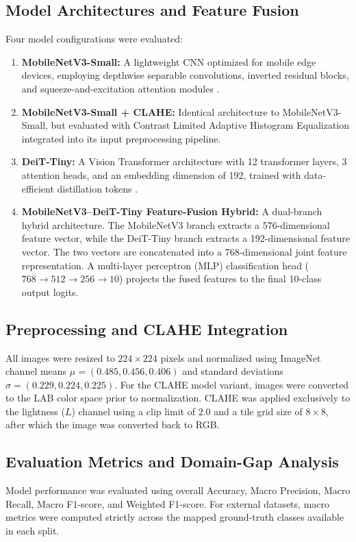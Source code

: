 \documentclass[10pt,journal,compsoc]{IEEEtran}
\begin{document}
\subsection{Model Architectures and Feature Fusion}
Four model configurations were evaluated:
\begin{enumerate}
    \item \textbf{MobileNetV3-Small:} A lightweight CNN optimized for mobile edge devices, employing depthwise separable convolutions, inverted residual blocks, and squeeze-and-excitation attention modules \cite{howard2019}.
    \item \textbf{MobileNetV3-Small + CLAHE:} Identical architecture to MobileNetV3-Small, but evaluated with Contrast Limited Adaptive Histogram Equalization integrated into its input preprocessing pipeline.
    \item \textbf{DeiT-Tiny:} A Vision Transformer architecture with 12 transformer layers, 3 attention heads, and an embedding dimension of 192, trained with data-efficient distillation tokens \cite{touvron2021}.
    \item \textbf{MobileNetV3--DeiT-Tiny Feature-Fusion Hybrid:} A dual-branch hybrid architecture. The MobileNetV3 branch extracts a 576-dimensional feature vector, while the DeiT-Tiny branch extracts a 192-dimensional feature vector. The two vectors are concatenated into a 768-dimensional joint feature representation. A multi-layer perceptron (MLP) classification head ($768 \rightarrow 512 \rightarrow 256 \rightarrow 10$) projects the fused features to the final 10-class output logits.
\end{enumerate}

\subsection{Preprocessing and CLAHE Integration}
All images were resized to $224 \times 224$ pixels and normalized using ImageNet channel means $\mu = (0.485, 0.456, 0.406)$ and standard deviations $\sigma = (0.229, 0.224, 0.225)$. For the CLAHE model variant, images were converted to the LAB color space prior to normalization. CLAHE was applied exclusively to the lightness ($L$) channel using a clip limit of $2.0$ and a tile grid size of $8 \times 8$, after which the image was converted back to RGB.

\subsection{Evaluation Metrics and Domain-Gap Analysis}
Model performance was evaluated using overall Accuracy, Macro Precision, Macro Recall, Macro F1-score, and Weighted F1-score. For external datasets, macro metrics were computed strictly across the mapped ground-truth classes available in each split.
\end{document}
